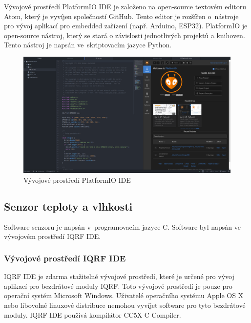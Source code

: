\documentclass[12pt,a4paper]{article}
\begin{document}
Vývojové prostředí PlatformIO IDE je založeno na open-source textovém editoru Atom, který je vyvíjen společností GitHub. Tento editor je rozšířen o~nástroje pro vývoj aplikací pro embedded zařízení (např. Arduino, ESP32). PlatformIO je open-source nástroj, který se stará o závislosti jednotlivých projektů a knihoven. Tento nástroj je napsán ve~skriptovacím jazyce Python. 

\begin{figure}[H]
\centering
\label{fig:platformio-ide}
\includegraphics[width = 150mm]{../img/platformio-ide.png}
\caption{Vývojové prostředí PlatformIO IDE}
\end{figure}

\newpage

\subsection{Senzor teploty a vlhkosti}

Software senzoru je napsán v~programovacím jazyce C. Software byl napsán ve vývojovém prostředí IQRF IDE\cite{iqrf/ide}.

\subsubsection{Vývojové prostředí IQRF IDE}

IQRF IDE\cite{iqrf/ide} je zdarma stažitelné vývojové prostředí, které je určené pro vývoj aplikací pro bezdrátové moduly IQRF. Toto vývojové prostředí je pouze pro operační systém Microsoft Windows. Uživatelé operačního systému Apple OS X nebo libovolné linuxové distribuce nemohou vyvíjet software pro tyto bezdrátové moduly. IQRF IDE používá kompilátor CC5X C Compiler\cite{sw/cc5x-compiler}.
\end{document}
